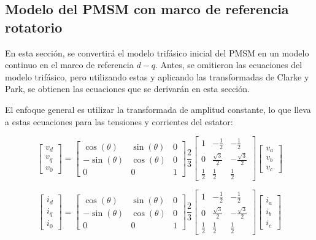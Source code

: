 \subsection{Modelo del PMSM con marco de referencia rotatorio}

En esta sección, se convertirá el modelo trifásico inicial del PMSM en un modelo continuo en el marco de referencia $d - q$. Antes, se omitieron las ecuaciones del modelo trifásico, pero utilizando estas y aplicando las transformadas de Clarke y Park, se obtienen las ecuaciones que se derivarán en esta sección.

El enfoque general es utilizar la transformada de amplitud constante, lo que lleva a estas ecuaciones para las tensiones y corrientes del estator:

\begin{equation}
	\begin{bmatrix}
		v_d \\
		v_q \\
		v_0
	\end{bmatrix}
	=
	\begin{bmatrix}
		\cos(\theta) & \sin(\theta) & 0  \\
		-\sin(\theta) & \cos(\theta) & 0  \\
		0 & 0 & 1
	\end{bmatrix}
	\frac{2}{3}
	\begin{bmatrix}
		1 & -\frac{1}{2} & -\frac{1}{2} \\
		0 & \frac{\sqrt{3}}{2} & -\frac{\sqrt{3}}{2} \\
		\frac{1}{2} & \frac{1}{2} & \frac{1}{2}
	\end{bmatrix}
	\begin{bmatrix}
		v_a \\
		v_b \\
		v_c
	\end{bmatrix}
\end{equation}

\begin{equation}
	\begin{bmatrix}
		i_d \\
		i_q \\
		i_0
	\end{bmatrix}
	=
	\begin{bmatrix}
		\cos(\theta) & \sin(\theta) & 0  \\
		-\sin(\theta) & \cos(\theta) & 0  \\
		0 & 0 & 1
	\end{bmatrix}
	\frac{2}{3}
	\begin{bmatrix}
		1 & -\frac{1}{2} & -\frac{1}{2} \\
		0 & \frac{\sqrt{3}}{2} & -\frac{\sqrt{3}}{2} \\
		\frac{1}{2} & \frac{1}{2} & \frac{1}{2}
	\end{bmatrix}
	\begin{bmatrix}
		i_a \\
		i_b \\
		i_c
	\end{bmatrix}
\end{equation}

